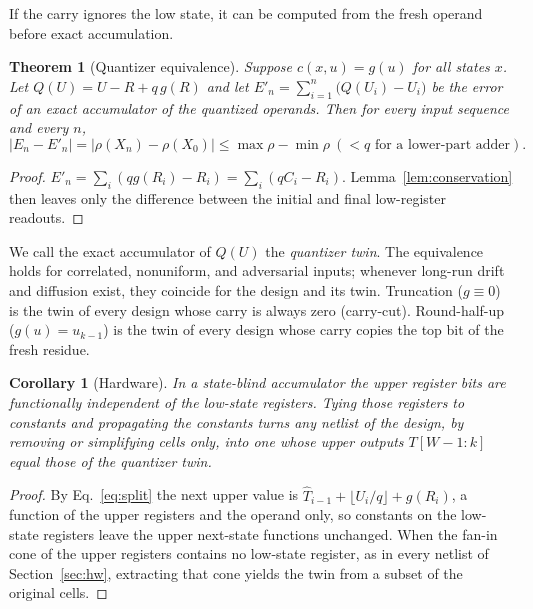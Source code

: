 \documentclass[preprint,12pt,numbers]{elsarticle}
\newtheorem{theorem}{Theorem}
\newtheorem{corollary}{Corollary}
\theoremstyle{definition}
\begin{document}
If the carry ignores the low state, it can be computed from the fresh
operand before exact accumulation.
\begin{theorem}[Quantizer equivalence]\label{thm:blind}
Suppose $c(x,u)=g(u)$ for all states $x$. Let $Q(U)=U-R+q\,g(R)$ and let
$E'_n=\sum_{i=1}^n\bigl(Q(U_i)-U_i\bigr)$ be the error of an exact accumulator
of the quantized operands. Then for every input sequence and every $n$,
\begin{equation}
|E_n-E'_n|=|\rho(X_n)-\rho(X_0)|\le\max\rho-\min\rho\ (<q\text{ for a lower-part adder}).
\end{equation}
\end{theorem}
\begin{proof}
$E'_n=\sum_i(qg(R_i)-R_i)=\sum_i(qC_i-R_i)$.
Lemma~\ref{lem:conservation} then leaves only the difference between the
initial and final low-register readouts.
\end{proof}

We call the exact accumulator of $Q(U)$ the \emph{quantizer twin}.
The equivalence holds for correlated, nonuniform, and adversarial inputs;
whenever long-run drift and diffusion exist, they coincide for the design
and its twin.
Truncation ($g\equiv0$) is the twin of every design whose carry is
always zero (carry-cut).
Round-half-up ($g(u)=u_{k-1}$) is the twin of every design whose carry
copies the top bit of the fresh residue.

\begin{corollary}[Hardware]\label{cor:prune}
In a state-blind accumulator the upper register bits are functionally
independent of the low-state registers. Tying those registers to constants
and propagating the constants turns any netlist of the design, by removing or
simplifying cells only, into one whose upper outputs $T[W{-}1{:}k]$ equal
those of the quantizer twin.
\end{corollary}
\begin{proof}
By Eq.~\eqref{eq:split} the next upper value is
$\hat T_{i-1}+\lfloor U_i/q\rfloor+g(R_i)$, a function of the upper registers
and the operand only, so constants on the low-state registers leave the upper
next-state functions unchanged. When the fan-in cone of the upper registers
contains no low-state register, as in every netlist of Section~\ref{sec:hw},
extracting that cone yields the twin from a subset of the original cells.
\end{proof}
\end{document}
